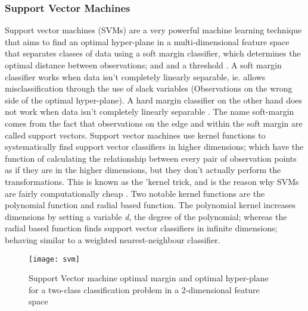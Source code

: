 \documentclass[11pt]{article}
\begin{document}
\newline\newline

\subsubsection{Support Vector Machines}
Support vector machines (SVMs) are a very powerful machine learning technique that aims to find an optimal hyper-plane in a multi-dimensional feature space that separates classes of data using a soft margin classifier, which determines the optimal distance between observations; and and a threshold \textcolor{cite}{\citet{cortesandvapnik1995}}. A soft margin classifier works when data isn't completely linearly separable, ie. allows misclassification through the use of slack variables (Observations on the wrong side of the optimal hyper-plane). A hard margin classifier on the other hand does not work when data isn't completely linearly separable \textcolor{cite}{\citet{boser}}. The name soft-margin comes from the fact that observations on the edge and within the soft margin are called support vectors. 
\newline\newline
Support vector machines use kernel functions to systematically find support vector classifiers in higher dimensions; which have the function of calculating the relationship between every pair of observation points as if they are in the higher dimensions, but they don't actually perform the transformations. This is known as the 'kernel trick, and is the reason why SVMs are fairly computationally cheap \textcolor{cite}{\citet{kernelfunctions}}. 
Two notable kernel functions are the polynomial function and radial based function. The polynomial kernel increases dimensions by setting a variable \textit{d}, the degree of the polynomial; whereas the radial based function finds support vector classifiers in infinite dimensions; behaving similar to a weighted nearest-neighbour classifier.
\newline\newline
\begin{figure}[h!]
\centering
\texttt{[image: svm]}
\caption{Support Vector machine optimal margin and optimal hyper-plane for a two-class classification problem in a 2-dimensional feature space}
\label{fig:svm}
\end{figure}
\newline
\end{document}
